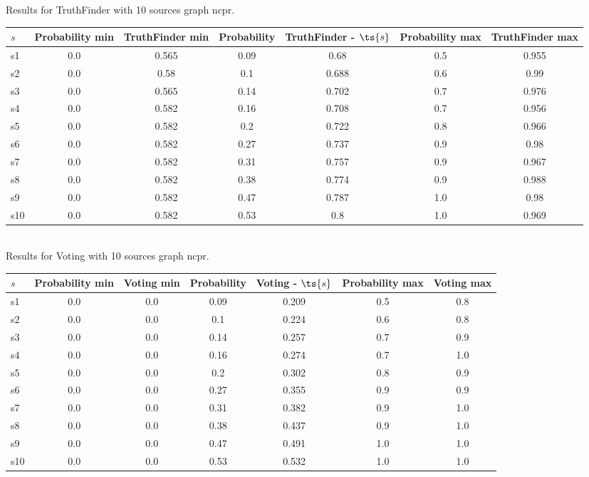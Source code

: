 \documentclass{article}
\begin{document}
\noindent Results for TruthFinder with 10 sources graph ncpr.

\noindent\begin{tabular}{|l|c|c|c|c|c|c|}
\hline
$s$& Probability min & TruthFinder min & Probability & TruthFinder - $\ts{s}$ & Probability max & TruthFinder max\\
\hline
s1 &0.0 & 0.565 & 0.09 & 0.68 & 0.5 & 0.955\\
\hline
s2 &0.0 & 0.58 & 0.1 & 0.688 & 0.6 & 0.99\\
\hline
s3 &0.0 & 0.565 & 0.14 & 0.702 & 0.7 & 0.976\\
\hline
s4 &0.0 & 0.582 & 0.16 & 0.708 & 0.7 & 0.956\\
\hline
s5 &0.0 & 0.582 & 0.2 & 0.722 & 0.8 & 0.966\\
\hline
s6 &0.0 & 0.582 & 0.27 & 0.737 & 0.9 & 0.98\\
\hline
s7 &0.0 & 0.582 & 0.31 & 0.757 & 0.9 & 0.967\\
\hline
s8 &0.0 & 0.582 & 0.38 & 0.774 & 0.9 & 0.988\\
\hline
s9 &0.0 & 0.582 & 0.47 & 0.787 & 1.0 & 0.98\\
\hline
s10 &0.0 & 0.582 & 0.53 & 0.8 & 1.0 & 0.969\\
\hline
\end{tabular}\\

\noindent Results for Voting with 10 sources graph ncpr.

\noindent\begin{tabular}{|l|c|c|c|c|c|c|}
\hline
$s$& Probability min & Voting min & Probability & Voting - $\ts{s}$ & Probability max & Voting max\\
\hline
s1 &0.0 & 0.0 & 0.09 & 0.209 & 0.5 & 0.8\\
\hline
s2 &0.0 & 0.0 & 0.1 & 0.224 & 0.6 & 0.8\\
\hline
s3 &0.0 & 0.0 & 0.14 & 0.257 & 0.7 & 0.9\\
\hline
s4 &0.0 & 0.0 & 0.16 & 0.274 & 0.7 & 1.0\\
\hline
s5 &0.0 & 0.0 & 0.2 & 0.302 & 0.8 & 0.9\\
\hline
s6 &0.0 & 0.0 & 0.27 & 0.355 & 0.9 & 0.9\\
\hline
s7 &0.0 & 0.0 & 0.31 & 0.382 & 0.9 & 1.0\\
\hline
s8 &0.0 & 0.0 & 0.38 & 0.437 & 0.9 & 1.0\\
\hline
s9 &0.0 & 0.0 & 0.47 & 0.491 & 1.0 & 1.0\\
\hline
s10 &0.0 & 0.0 & 0.53 & 0.532 & 1.0 & 1.0\\
\hline
\end{tabular}\\
\end{document}
